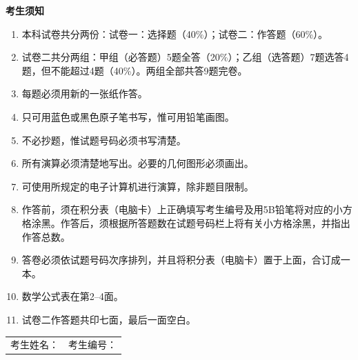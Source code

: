 \documentclass[12pt,a4paper]{exam-zh}
\begin{document}
\vspace{1.2em}
{\bfseries 考生须知}
\begin{enumerate}[label=（\arabic*）,leftmargin=2.6em,itemsep=0.5em]
  \item 本科试卷共分两份：试卷一：选择题（40\%）；试卷二：作答题（60\%）。
  \item 试卷二共分两组：甲组（必答题）5题全答（20\%）；乙组（选答题）7题选答4题，但不能超过4题（40\%）。两组全部共答9题完卷。
  \item 每题必须用新的一张纸作答。
  \item 只可用蓝色或黑色原子笔书写，惟可用铅笔画图。
  \item 不必抄题，惟试题号码必须书写清楚。
  \item 所有演算必须清楚地写出。必要的几何图形必须画出。
  \item 可使用所规定的电子计算机进行演算，除非题目限制。
  \item 作答前，须在积分表（电脑卡）上正确填写考生编号及用5B铅笔将对应的小方格涂黑。作答后，须根据所答题数在试题号码栏上将有关小方格涂黑，并指出作答总数。
  \item 答卷必须依试题号码次序排列，并且将积分表（电脑卡）置于上面，合订成一本。
  \item 数学公式表在第2--4面。
  \item 试卷二作答题共印七面，最后一面空白。
\end{enumerate}

\vfill
\begin{center}\fbox{\rule{0pt}{1.1em}\hspace{1em}{\bfseries 未经正式宣布\quad 不得翻看内页}\hspace{1em}}\end{center}

\vspace{1em}
\begin{tabular*}{\linewidth}{@{\extracolsep{\fill}}ll}
考生姓名：\underline{\hspace{5cm}} & 考生编号：\underline{\hspace{4cm}}
\end{tabular*}

\newpage
\end{document}
